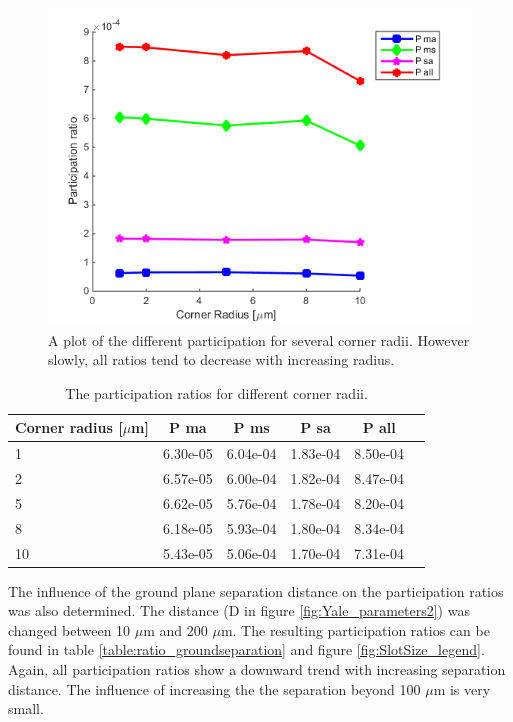  \begin{figure}
 	\centering
 	\includegraphics[scale = 0.7]{Figures/Ratio_plots/CornerRadius_legend}
 	\caption{A plot of the different participation for several corner radii. However slowly, all ratios tend to decrease with increasing radius.}
 	\label{fig:CornerRadius}
 \end{figure}

\begin{table}
	\begin{center}
		\begin{tabular}{ | l || c | c | c | c | c |}
			\hline
			Corner radius [\(\mu\)m] & P ma & P ms & P sa & P all \\ \hline
			1 & 6.30e-05 & 6.04e-04 & 1.83e-04 & 8.50e-04 \\
			2 & 6.57e-05 & 6.00e-04 & 1.82e-04 & 8.47e-04 \\
			5 & 6.62e-05 & 5.76e-04 & 1.78e-04 & 8.20e-04\\
			8 & 6.18e-05 & 5.93e-04 & 1.80e-04 & 8.34e-04\\
			10 & 5.43e-05 & 5.06e-04 & 1.70e-04 & 7.31e-04\\
			\hline
		\end{tabular}
	\end{center}
	\caption{The participation ratios for different corner radii.}
	\label{table:ratio_cornerradius}
\end{table}

The influence of the ground plane separation distance on the participation ratios was also determined. The distance (D in figure \ref{fig:Yale_parameters2}) was changed between 10 \(\mu\)m and 200 \(\mu\)m. The resulting participation ratios can be found in table \ref{table:ratio_groundseparation} and figure \ref{fig:SlotSize_legend}. Again, all participation ratios show a downward trend with increasing separation distance. The influence of increasing the the separation beyond 100 \(\mu\)m is very small.

